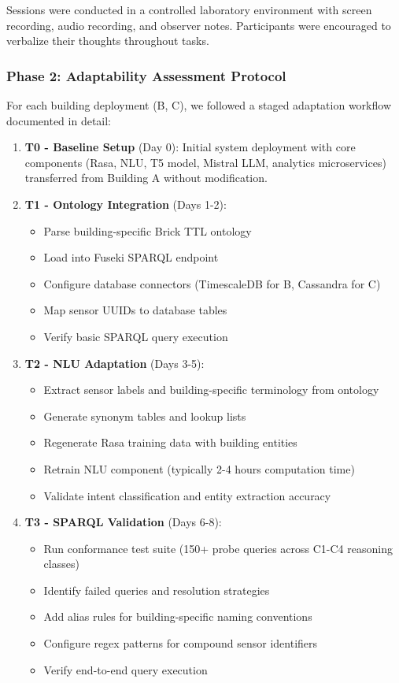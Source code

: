 \documentclass[acmlarge]{acmart}
\begin{document}
Sessions were conducted in a controlled laboratory environment with screen recording, audio recording, and observer notes. Participants were encouraged to verbalize their thoughts throughout tasks.

\subsubsection{Phase 2: Adaptability Assessment Protocol}

For each building deployment (B, C), we followed a staged adaptation workflow documented in detail:

\begin{enumerate}
    \item \textbf{T0 - Baseline Setup} (Day 0): Initial system deployment with core components (Rasa, NLU, T5 model, Mistral LLM, analytics microservices) transferred from Building A without modification.
    
    \item \textbf{T1 - Ontology Integration} (Days 1-2): 
    \begin{itemize}
        \item Parse building-specific Brick TTL ontology
        \item Load into Fuseki SPARQL endpoint
        \item Configure database connectors (TimescaleDB for B, Cassandra for C)
        \item Map sensor UUIDs to database tables
        \item Verify basic SPARQL query execution
    \end{itemize}
    
    \item \textbf{T2 - NLU Adaptation} (Days 3-5):
    \begin{itemize}
        \item Extract sensor labels and building-specific terminology from ontology
        \item Generate synonym tables and lookup lists
        \item Regenerate Rasa training data with building entities
        \item Retrain NLU component (typically 2-4 hours computation time)
        \item Validate intent classification and entity extraction accuracy
    \end{itemize}
    
    \item \textbf{T3 - SPARQL Validation} (Days 6-8):
    \begin{itemize}
        \item Run conformance test suite (150+ probe queries across C1-C4 reasoning classes)
        \item Identify failed queries and resolution strategies
        \item Add alias rules for building-specific naming conventions
        \item Configure regex patterns for compound sensor identifiers
        \item Verify end-to-end query execution
    \end{itemize}
    

\end{enumerate}
\end{document}
